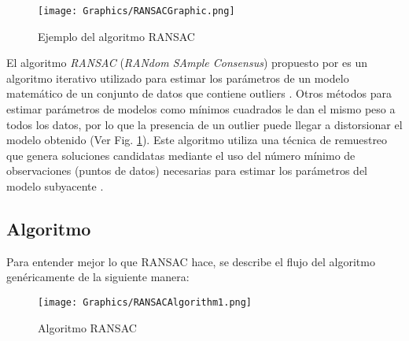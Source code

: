 \begin{figure}[b]
    \centering
    \texttt{[image: Graphics/RANSACGraphic.png]}
    \caption{Ejemplo del algoritmo RANSAC}
    \label{fig:RANSACExample}
\end{figure}

El algoritmo \textit{RANSAC} (\textit{RANdom SAmple Consensus}) propuesto por \cite{FischlerBolles} es un algoritmo iterativo utilizado para estimar los parámetros de un modelo matemático de un conjunto de datos que contiene outliers \cite{PabloJuan}. Otros métodos para estimar parámetros de modelos como mínimos cuadrados le dan el mismo peso a todos los datos, por lo que la presencia de un outlier puede llegar a distorsionar el modelo obtenido (Ver Fig. \ref{fig:RANSACExample}). Este algoritmo utiliza una técnica de remuestreo que genera soluciones candidatas mediante el uso del número mínimo de observaciones (puntos de datos) necesarias para estimar los parámetros del modelo subyacente \cite{Konstantinos}.

\subsection{Algoritmo}

Para entender mejor lo que RANSAC hace, se describe el flujo del algoritmo genéricamente de la siguiente manera:

\begin{figure}[!h]
	\centering
	\texttt{[image: Graphics/RANSACAlgorithm1.png]}
	\caption{Algoritmo RANSAC}
	\label{fig:RANSACAlgorithm}
\end{figure}

